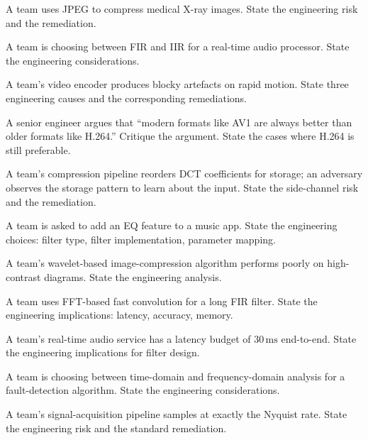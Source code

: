 \begin{exercise}
A team uses JPEG to compress medical X-ray images. State the engineering risk and the remediation.
\end{exercise}

\begin{exercise}
A team is choosing between FIR and IIR for a real-time audio processor. State the engineering considerations.
\end{exercise}

\begin{exercise}
A team's video encoder produces blocky artefacts on rapid motion. State three engineering causes and the corresponding remediations.
\end{exercise}

\begin{exercise}
A senior engineer argues that ``modern formats like AV1 are always better than older formats like H.264.'' Critique the argument. State the cases where H.264 is still preferable.
\end{exercise}

\begin{exercise}
A team's compression pipeline reorders DCT coefficients for storage; an adversary observes the storage pattern to learn about the input. State the side-channel risk and the remediation.
\end{exercise}

\begin{exercise}
A team is asked to add an EQ feature to a music app. State the engineering choices: filter type, filter implementation, parameter mapping.
\end{exercise}

\begin{exercise}
A team's wavelet-based image-compression algorithm performs poorly on high-contrast diagrams. State the engineering analysis.
\end{exercise}

\begin{exercise}
A team uses FFT-based fast convolution for a long FIR filter. State the engineering implications: latency, accuracy, memory.
\end{exercise}

\begin{exercise}
A team's real-time audio service has a latency budget of $30\,\si{\milli\second}$ end-to-end. State the engineering implications for filter design.
\end{exercise}

\begin{exercise}
A team is choosing between time-domain and frequency-domain analysis for a fault-detection algorithm. State the engineering considerations.
\end{exercise}

\begin{exercise}
A team's signal-acquisition pipeline samples at exactly the Nyquist rate. State the engineering risk and the standard remediation.
\end{exercise}
